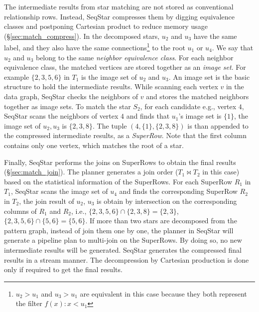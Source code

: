 The intermediate results from star matching are not stored as conventional relationship rows.
Instead, SeqStar compresses them by digging equivalence classes and postponing Cartesian product to reduce memory usage (\S\ref{sec:match_compress}).
In the decomposed stars, $u_2$ and $u_3$ have the same label, and they also have the same connections\footnote{$u_2 > u_1$ and $u_3 > u_1$ are equivalent in this case because they both represent the filter $f(x): x < u_1$} to the root $u_1$ or $u_4$.
We say that $u_2$ and $u_3$ belong to the same \emph{neighbor equivalence class}.
For each neighbor equivalence class, the matched vertices are stored together as an \emph{image set}.
For example $\{2, 3, 5, 6\}$ in $T_1$ is the image set of $u_2$ and $u_3$.
An image set is the basic structure to hold the intermediate results.
While scanning each vertex $v$ in the data graph,
SeqStar checks the neighbors of $v$ and stores the matched neighbors together as image sets.
To match the star $S_2$,
for each candidate e.g., vertex $4$, SeqStar scans the neighbors of vertex $4$ and finds that $u_1$'s image set is $\{1\}$,
the image set of $u_2, u_3$ is $\{2, 3, 8\}$.
The tuple $(4, \{1\}, \{2, 3, 8\})$ is than appended to the compressed intermediate results, as a \emph{SuperRow}.
Note that the first column contains only one vertex, which matches the root of a star.

Finally, SeqStar performs the joins on SuperRows to obtain the final results (\S\ref{sec:match_join}). The planner generates a join order ($T_1 \Join T_2$ in this case) based on the statistical information of the SuperRows.
For each SuperRow $R_1$ in $T_1$, SeqStar scans the image set of $u_4$ and finds the corresponding SuperRow $R_2$ in $T_2$,
the join result of $u_2$, $u_3$ is obtain by intersection on the corresponding columns of $R_1$ and $R_2$,
i.e., $\{2, 3, 5, 6\} \cap \{2, 3, 8\} = \{2, 3\}$, $\{2, 3, 5, 6\} \cap \{5, 6\} = \{5, 6\}$.
If more than two stars are decomposed from the pattern graph,
instead of join them one by one,
the planner in SeqStar will generate a pipeline plan to multi-join on the SuperRows.
By doing so, no new intermediate results will be generated.
SeqStar generates the compressed final results in a stream manner.
The decompression by Cartesian production is done only if required to get the final results.


